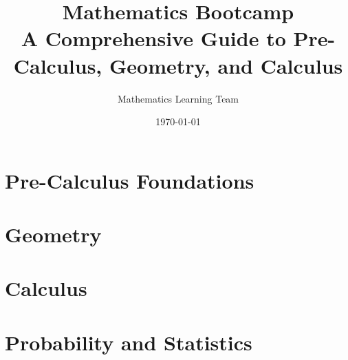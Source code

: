 \documentclass{book}
\title{Mathematics Bootcamp\\
       \large A Comprehensive Guide to Pre-Calculus, Geometry, and Calculus}
\author{Mathematics Learning Team}
\date{\today}
\begin{document}
\maketitle
\tableofcontents

\part{Pre-Calculus Foundations}










\part{Geometry}





\part{Calculus}




\part{Probability and Statistics}

% 

% 
% 
\end{document}

